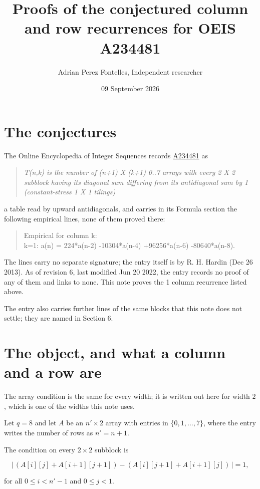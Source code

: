 \documentclass[11pt]{article}
\title{Proofs of the conjectured column and row recurrences for OEIS A234481}
\author{Adrian Perez Fontelles, Independent researcher}
\date{09 September 2026}
\theoremstyle{definition}
\begin{document}
\maketitle
\section{The conjectures}

The Online Encyclopedia of Integer Sequences records \href{https://oeis.org/A234481}{A234481} as

\begin{quote}\itshape T(n,k) is the number of (n+1) X (k+1) 0..7 arrays with every 2 X 2 subblock having its diagonal sum differing from its antidiagonal sum by 1 (constant-stress 1 X 1 tilings)\end{quote}

a table read by upward antidiagonals, and carries in its Formula section the following empirical lines, none of them proved there:

\begin{quote}\ttfamily Empirical for column k:\\
k=1: a(n) = 224*a(n-2) -10304*a(n-4) +96256*a(n-6) -80640*a(n-8).\end{quote}

The lines carry no separate signature; the entry itself is by R. H. Hardin (Dec 26 2013). As of revision 6, last modified Jun 20 2022, the entry records no proof of any of them and links to none. This note proves the 1 column recurrence listed above.

The entry also carries further lines of the same blocks that this note does not settle; they are named in Section 6.

\section{The object, and what a column and a row are}

The array condition is the same for every width; it is written out here for width $2$, which is one of the widths this note uses.

Let $q = 8$ and let $A$ be an $n' \times 2$ array with entries in $\{0,1,\dots,7\}$, where the entry writes the number of rows as $n' = n + 1$.

The condition on every $2 \times 2$ subblock is

\[\bigl|\,(A[i][j] + A[i{+}1][j{+}1]) - (A[i][j{+}1] + A[i{+}1][j])\,\bigr| = 1,\]

for all $0 \le i < n'-1$ and $0 \le j < 1$.
\end{document}
